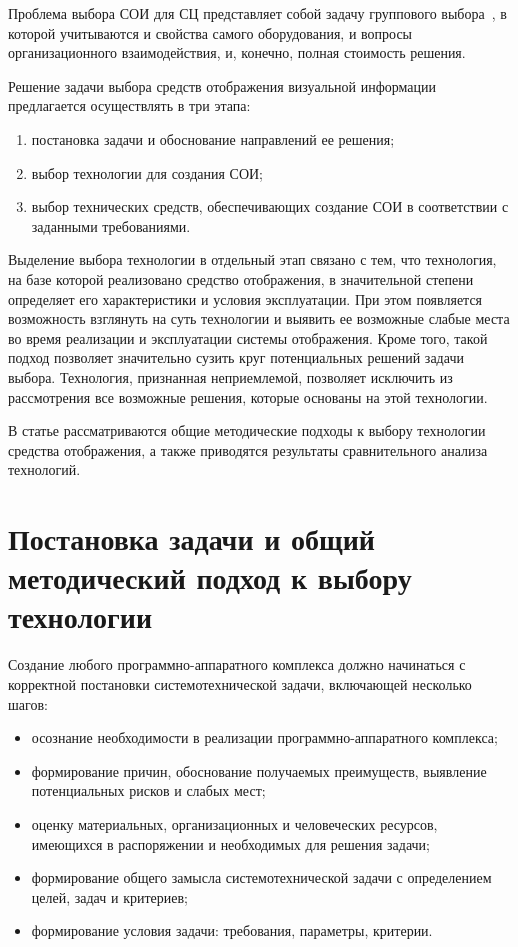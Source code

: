 \begin{multicols}{2}
    Проблема выбора СОИ для СЦ 
пред\-став\-ля\-ет собой задачу группового выбора~\cite{7chu}, в которой 
учитываются и свойства самого оборудования, и вопросы организационного 
взаимодействия, и, конечно, полная стоимость решения. 
   
   Решение задачи выбора средств отображения визуальной информации 
предлагается осуществлять в три этапа:
   \begin{enumerate}[(1)]
\item постановка задачи и обоснование направлений ее решения;
\item выбор технологии для создания СОИ;
\item выбор технических средств, обеспечивающих создание 
СОИ в соответствии с заданными требованиями.
\end{enumerate}

   Выделение выбора технологии в отдельный этап связано с тем, что 
технология, на базе которой реализовано средство отображения, в 
значительной степени определяет его характеристики и условия 
эксплуатации. При этом появляется возможность взглянуть на суть 
технологии и выявить ее возможные слабые места во время реализации и 
эксплуатации системы отображения. Кроме того, такой подход позволяет 
значительно сузить круг потенциальных решений задачи выбора. 
Технология, признанная неприемлемой, позволяет исключить из 
рассмотрения все возможные решения, которые основаны на этой 
технологии. 
     
     В статье рассматриваются общие методические подходы к выбору 
технологии средства отображения, а также приводятся результаты 
сравнительного анализа технологий. 

\vspace*{-6pt}
   
\section{Постановка задачи и общий методический подход к выбору 
технологии}

\vspace*{-2pt}

   Создание любого программно-аппаратного комплекса должно начинаться 
с корректной постановки системотехнической задачи, включающей несколько 
шагов: 
   \begin{itemize}
\item осознание необходимости в реализации программно-аппаратного 
комплекса;
\item формирование причин, обоснование по\-лу\-ча\-емых преимуществ, 
выявление потенциальных рисков и слабых мест; 
\item оценку материальных, организационных и человеческих ресурсов, 
имеющихся в распоряжении и необходимых для решения задачи;
\item формирование общего замысла системотехнической задачи с 
определением целей, задач и критериев;
\item формирование условия задачи: требования, параметры, критерии. 
\end{itemize}


\end{multicols}

